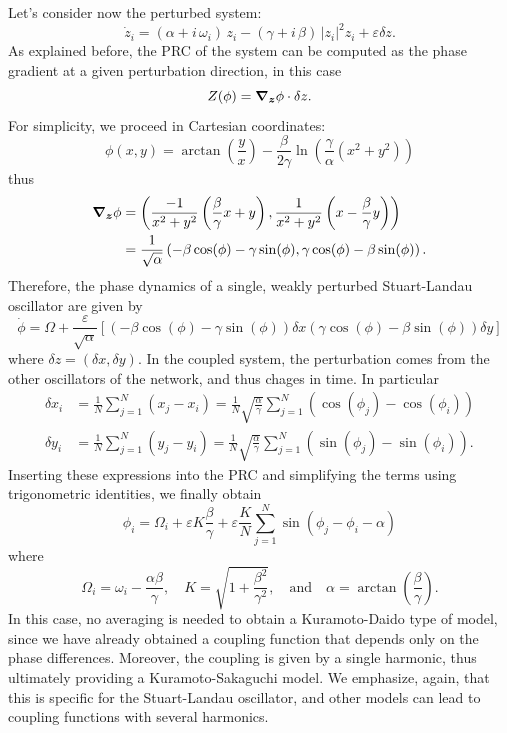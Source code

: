 Let's consider now the perturbed system:
\begin{equation}
\dot{z}_{i} = (\alpha + i\,\omega_{i})\,z_{i}
             - (\gamma + i\,\beta)\,\lvert z_{i}\rvert^{2}z_{i}
             + {\varepsilon} \delta z.
\end{equation}
As explained before, the PRC of the system can be computed as the phase gradient at a given perturbation direction,
in this case
$$Z(\phi)=\grad_{\boldsymbol{z}}\phi\cdot \delta z.$$
For simplicity, we proceed in Cartesian coordinates:
\begin{equation}
    \phi(x,y) = \arctan\left(\frac{y}{x}\right) - \frac{\beta}{2\gamma}\ln\left(\frac{\gamma}{\alpha} (x^2+y^2) \right)
\end{equation}
thus
\begin{align}
\grad_{\boldsymbol{z}}\phi &= \left( \frac{-1}{x^2+y^2}\left(\frac{\beta}{\gamma}x+y\right), \frac{1}{x^2+y^2}\left(x-\frac{\beta}{\gamma}y\right)\right) \\
&= \frac{1}{\sqrt{\alpha}} \left( - \beta\cos(\phi)-\gamma\sin(\phi), \gamma \cos(\phi)-\beta \sin(\phi) \right).
\end{align}
Therefore, the phase dynamics of a single, weakly perturbed Stuart-Landau oscillator
are given by
$$\dot \phi = \Omega + \frac{\varepsilon}{\sqrt{\alpha}}
\left[ 
\left( - \beta\cos(\phi)-\gamma\sin(\phi)\right)\delta x
\left(\gamma \cos(\phi)-\beta \sin(\phi) \right)\delta y
\right] $$
where $\delta z = (\delta x,\delta y)$.
In the coupled system, the perturbation comes from the other oscillators of the network, and thus chages in time.
In particular 
\begin{align}
\delta x_i &= \frac{1}{N}\sum_{j=1}^N (x_j-x_i) = \frac{1}{N}\sqrt{\frac{\alpha}{\gamma}}\sum_{j=1}^N (\cos(\phi_j)-\cos(\phi_i))\\
\delta y_i &= \frac{1}{N}\sum_{j=1}^N (y_j-y_i) = \frac{1}{N}\sqrt{\frac{\alpha}{\gamma}}\sum_{j=1}^N (\sin(\phi_j)-\sin(\phi_i)) . 
\end{align}
Inserting these expressions into the PRC and simplifying the terms using trigonometric identities, we finally obtain
\begin{equation}
    \phi_i = \Omega_i + \varepsilon K \frac{\beta}{\gamma}  + \varepsilon \frac{K}{N}\sum_{j=1}^N \sin(\phi_j-\phi_i-\alpha)
\end{equation}
where 
$$\Omega_i =  \omega_i - \frac{\alpha \beta }{\gamma},\quad K = \sqrt{1+\frac{\beta^2}{\gamma^2}},\quad\text{and}\quad\alpha=\arctan\left(\frac{\beta}{\gamma} \right).$$
In this case, no averaging is needed to obtain a Kuramoto-Daido type of model,
since we have already obtained a coupling function that depends only on the phase differences.
Moreover, the coupling is given by a single harmonic, thus ultimately providing a Kuramoto-Sakaguchi model. 
We emphasize, again, that this is specific for the Stuart-Landau oscillator, and other models can lead to 
coupling functions with several harmonics. 